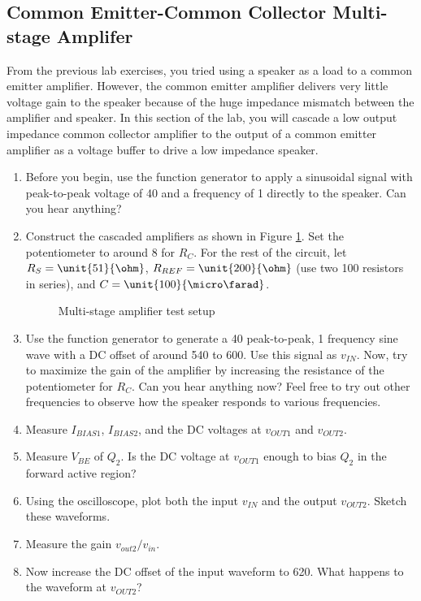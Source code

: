 \documentclass{article}
\begin{document}
\subsection{Common Emitter-Common Collector Multi-stage Amplifer}
	
	From the previous lab exercises, you tried using a speaker as a load to a common emitter amplifier. However, the common emitter amplifier delivers very little voltage gain to the speaker because of the huge impedance mismatch between the amplifier and speaker. In this section of the lab, you will cascade a low output impedance common collector amplifier to the output of a common emitter amplifier as a voltage buffer to drive a low impedance speaker.

\begin{enumerate}

	\item Before you begin, use the function generator to apply a sinusoidal signal with peak-to-peak voltage of \unit{40}{\milli\volt} and a frequency of \unit{1}{\kilo\hertz} directly to the speaker. Can you hear anything?

	\item Construct the cascaded amplifiers as shown in Figure \ref{audio}. Set the potentiometer to around \unit{8}{\kilo\ohm} for $R_C$. For the rest of the circuit, let $R_S = \unit{51}{\ohm}$, $R_{REF} = \unit{200}{\ohm}$ (use two \unit{100}{\ohm} resistors in series), and $C = \unit{100}{\micro\farad}$. 

	\begin{figure}[!htb]
		
		\centerline{\box\graph}
		\caption{Multi-stage amplifier test setup}
		\label{audio}
	\end{figure}

	\item Use the function generator to generate a \unit{40}{\milli\volt} peak-to-peak, \unit{1}{\kilo\hertz} frequency sine wave with a DC offset of around \unit{540}{\milli\volt} to \unit{600}{\milli\volt}. Use this signal as $v_{IN}$. Now, try to maximize the gain of the amplifier by increasing the resistance of the potentiometer for $R_C$. Can you hear anything now? Feel free to try out other frequencies to observe how the speaker responds to various frequencies.

	\item Measure $I_{BIAS1}$, $I_{BIAS2}$, and the DC voltages at $v_{OUT1}$ and $v_{OUT2}$.

	\item Measure $V_{BE}$ of $Q_2$. Is the DC voltage at $v_{OUT1}$ enough to bias $Q_2$ in the forward active region?

	\item Using the oscilloscope, plot both the input $v_{IN}$ and the output $v_{OUT2}$. Sketch these waveforms.

	\item Measure the gain $v_{out2}/v_{in}$.

	\item Now increase the DC offset of the input waveform to \unit{620}{\milli\volt}. What happens to the waveform at $v_{OUT2}$?

\end{enumerate}
\end{document}
